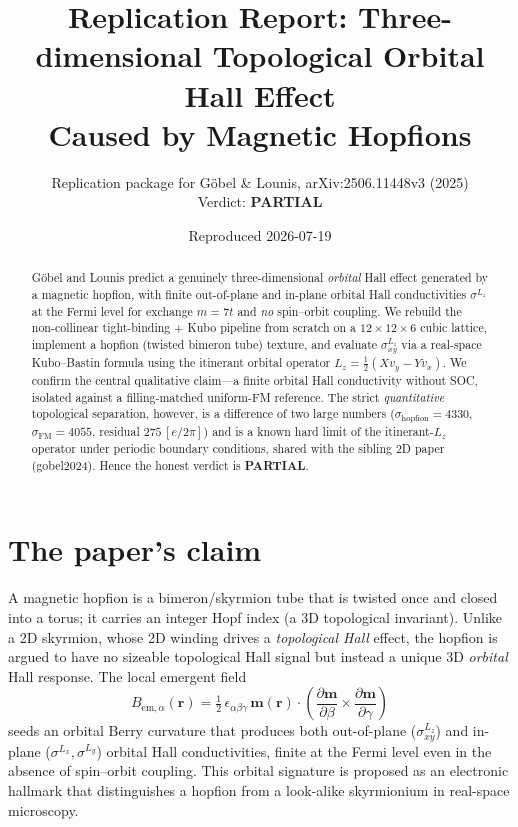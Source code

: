 \documentclass[11pt]{article}
\title{Replication Report: Three-dimensional Topological Orbital Hall Effect\\
Caused by Magnetic Hopfions}
\author{Replication package for G\"obel \& Lounis, arXiv:2506.11448v3 (2025)\\
Verdict: \textbf{PARTIAL}}
\date{Reproduced 2026-07-19}
\begin{document}
\maketitle

\begin{abstract}
G\"obel and Lounis predict a genuinely three-dimensional \emph{orbital} Hall effect
generated by a magnetic hopfion, with finite out-of-plane and in-plane orbital Hall
conductivities $\sigma^{L_z}$ at the Fermi level for exchange $m=7t$ and \emph{no}
spin--orbit coupling. We rebuild the non-collinear tight-binding + Kubo pipeline from
scratch on a $12\times12\times6$ cubic lattice, implement a hopfion (twisted bimeron
tube) texture, and evaluate $\sigma^{L_z}_{xy}$ via a real-space Kubo--Bastin formula
using the itinerant orbital operator $L_z=\tfrac12(X v_y - Y v_x)$. We confirm the
central qualitative claim---a finite orbital Hall conductivity without SOC, isolated
against a filling-matched uniform-FM reference. The strict \emph{quantitative}
topological separation, however, is a difference of two large numbers
($\sigma_{\text{hopfion}}=4330$, $\sigma_{\text{FM}}=4055$, residual $275\,[e/2\pi]$)
and is a known hard limit of the itinerant-$L_z$ operator under periodic boundary
conditions, shared with the sibling 2D paper (gobel2024). Hence the honest verdict is
\textbf{PARTIAL}.
\end{abstract}

\section{The paper's claim}
A magnetic hopfion is a bimeron/skyrmion tube that is twisted once and closed into a
torus; it carries an integer Hopf index (a 3D topological invariant). Unlike a 2D
skyrmion, whose 2D winding drives a \emph{topological Hall} effect, the hopfion is
argued to have no sizeable topological Hall signal but instead a unique 3D
\emph{orbital} Hall response. The local emergent field
\begin{equation}
B_{\text{em},\alpha}(\mathbf r)=\tfrac12\,\epsilon_{\alpha\beta\gamma}\,
\mathbf m(\mathbf r)\cdot\!\left(\frac{\partial \mathbf m}{\partial\beta}\times
\frac{\partial \mathbf m}{\partial\gamma}\right)
\end{equation}
seeds an orbital Berry curvature that produces both out-of-plane ($\sigma^{L_z}_{xy}$)
and in-plane ($\sigma^{L_x},\sigma^{L_y}$) orbital Hall conductivities, finite at the
Fermi level even in the absence of spin--orbit coupling. This orbital signature is
proposed as an electronic hallmark that distinguishes a hopfion from a look-alike
skyrmionium in real-space microscopy.
\end{document}
